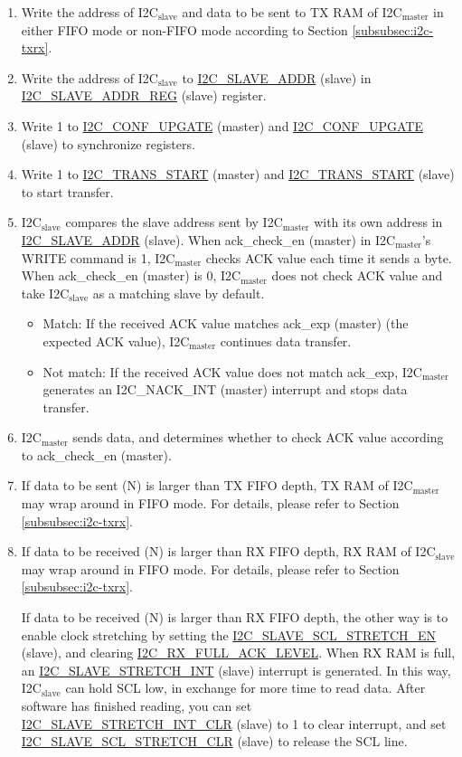 \documentclass[main\_\_EN.tex]{subfiles}
\begin{document}
\begin{enumerate}
\item Write the address of I2C$_\text{slave}$ and data to be sent to TX RAM of I2C$_\text{master}$ in either FIFO mode or non-FIFO mode according to Section \ref{subsubsec:i2c-txrx}.
\item Write the address of I2C$_\text{slave}$ to \hyperref[fielddesc:I2CSLAVEADDR]{I2C\_SLAVE\_ADDR} (slave) in \hyperref[regdesc:I2CSLAVEADDRREG]{I2C\_SLAVE\_ADDR\_REG} (slave) register.
\item Write 1 to \hyperref[fielddesc:I2CCONFUPGATE]{I2C\_CONF\_UPGATE} (master) and \hyperref[fielddesc:I2CCONFUPGATE]{I2C\_CONF\_UPGATE} (slave) to synchronize registers.
\item Write 1 to \hyperref[fielddesc:I2CTRANSSTART]{I2C\_TRANS\_START} (master) and \hyperref[fielddesc:I2CTRANSSTART]{I2C\_TRANS\_START} (slave) to start transfer.
\item I2C$_\text{slave}$ compares the slave address sent by I2C$_\text{master}$ with its own address in \hyperref[fielddesc:I2CSLAVEADDR]{I2C\_SLAVE\_ADDR} (slave). When ack\_check\_en (master) in I2C$_\text{master}$'s WRITE command is 1, I2C$_\text{master}$ checks ACK value each time it sends a byte. When ack\_check\_en (master) is 0, I2C$_\text{master}$ does not check ACK value and take I2C$_\text{slave}$ as a matching slave by default.
\begin{itemize}
\item Match: If the received ACK value matches ack\_exp (master) (the expected ACK value), I2C$_\text{master}$ continues data transfer.
\item Not match: If the received ACK value does not match ack\_exp, I2C$_\text{master}$ generates an I2C\_NACK\_INT (master) interrupt and stops data transfer.
\end{itemize}

\item I2C$_\text{master}$ sends data, and determines whether to check ACK value according to ack\_check\_en (master).
\item If data to be sent (N) is larger than TX FIFO depth, TX RAM of I2C$_\text{master}$ may wrap around in FIFO mode. For details, please refer to Section \ref{subsubsec:i2c-txrx}. 
\item If data to be received (N) is larger than RX FIFO depth, RX RAM of I2C$_\text{slave}$ may wrap around in FIFO mode. For details, please refer to Section \ref{subsubsec:i2c-txrx}. 

If data to be received (N) is larger than RX FIFO depth, the other way is to enable clock stretching by setting the \hyperref[fielddesc:I2CSLAVESCLSTRETCHEN]{I2C\_SLAVE\_SCL\_STRETCH\_EN} (slave), and clearing \hyperref[fielddesc:I2CRXFULLACKLEVEL]{I2C\_RX\_FULL\_ACK\_LEVEL}. When RX RAM is full, an \hyperref[int:i2c-slave-stretch]{I2C\_SLAVE\_STRETCH\_INT} (slave) interrupt is generated. In this way, I2C$_\text{slave}$ can hold SCL low, in exchange for more time to read data. After software has finished reading, you can set \hyperref[fielddesc:I2CSLAVESTRETCHINTCLR]{I2C\_SLAVE\_STRETCH\_INT\_CLR} (slave) to 1 to clear interrupt, and set \hyperref[fielddesc:I2CSLAVESCLSTRETCHCLR]{I2C\_SLAVE\_SCL\_STRETCH\_CLR} (slave) to release the SCL line.


\end{enumerate}
\end{document}
